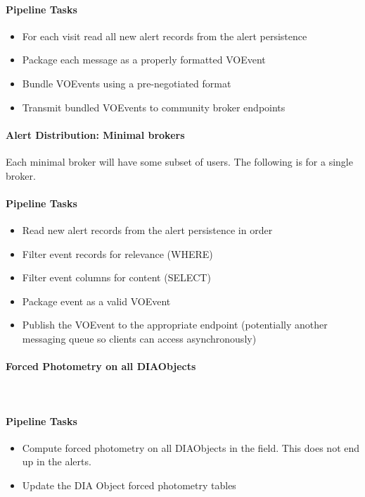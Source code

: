 \paragraph{Pipeline Tasks}
\begin{itemize}
\item For each visit read all new alert records from the alert persistence
\item Package each message as a properly formatted VOEvent
\item Bundle VOEvents using a pre-negotiated format
\item Transmit bundled VOEvents to community broker endpoints
\end{itemize}

\paragraph{Alert Distribution: Minimal brokers}
\noindent
Each minimal broker will have some subset of users.  The following is for a single broker.

\paragraph{Pipeline Tasks}
\begin{itemize}
\item Read new alert records from the alert persistence in order
\item Filter event records for relevance (WHERE)
\item Filter event columns for content (SELECT)
\item Package event as a valid VOEvent
\item Publish the VOEvent to the appropriate endpoint (potentially another messaging queue so clients can access asynchronously)
\end{itemize}

\paragraph{Forced Photometry on all DIAObjects}~

\paragraph{Pipeline Tasks}
\begin{itemize}
\item Compute forced photometry on all DIAObjects in the field.  This
  does not end up in the alerts.
\item Update the DIA Object forced photometry tables
\end{itemize}

